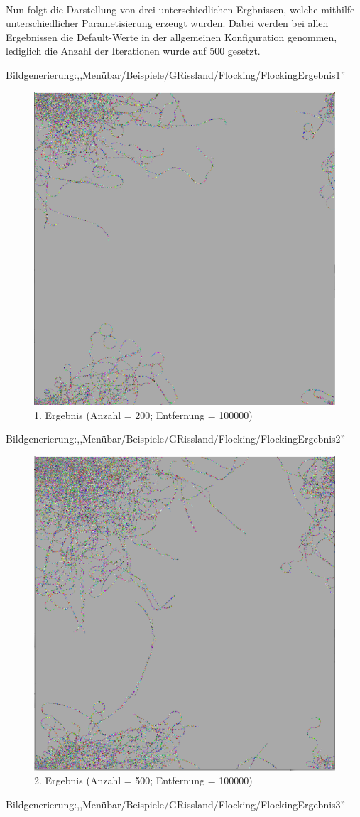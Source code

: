 \documentclass[../mciAusarbeitung.tex]{subfiles}
\begin{document}
 $~$ \\Nun folgt die Darstellung von drei unterschiedlichen Ergbnissen, welche mithilfe unterschiedlicher Parametisierung erzeugt wurden. Dabei werden bei allen Ergebnissen die Default-Werte in der allgemeinen Konfiguration genommen, lediglich die Anzahl der Iterationen wurde auf 500 gesetzt.
     
Bildgenerierung:,,Menübar/Beispiele/GRissland/Flocking/FlockingErgebnis1''\\  
\begin{figure}[H]
\centering
\includegraphics[width=0.5\linewidth]{"Flocking_default.png"}
\caption[Flocking-Beispiel1]{1. Ergebnis (Anzahl = 200; Entfernung = 100000)}
\end{figure}  
Bildgenerierung:,,Menübar/Beispiele/GRissland/Flocking/FlockingErgebnis2''\\     
\begin{figure}[H]
\centering
\includegraphics[width=0.5\linewidth]{"Flocking_anzahl500.png"}
\caption[Flocking-Beispiel2]{2. Ergebnis (Anzahl = 500; Entfernung = 100000)}
\end{figure} 
Bildgenerierung:,,Menübar/Beispiele/GRissland/Flocking/FlockingErgebnis3''\\  
\end{document}
